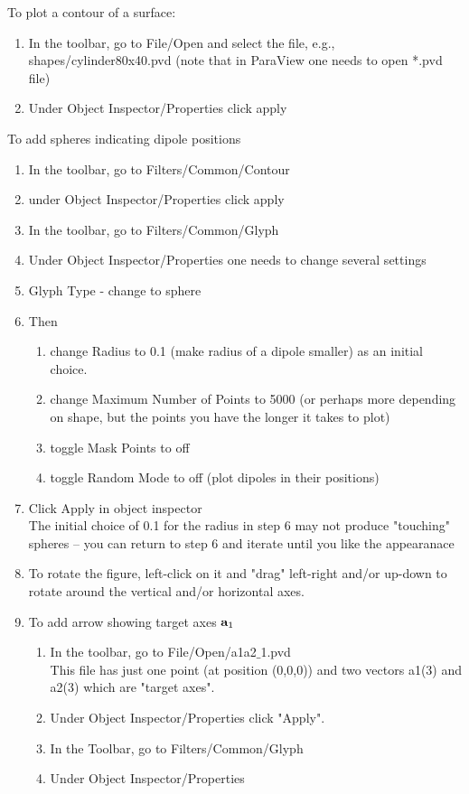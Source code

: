 To plot a contour of a surface:

\begin{enumerate}
\item In the toolbar, go to File/Open 
      and select the file, e.g., \textquotedbl{}shapes/cylinder80x40.pvd
      \textquotedbl{} (note that in ParaView one needs to open
{*}.pvd file) 
\item Under Object Inspector/Properties
 click \textquotedbl{}apply\textquotedbl{}
\end{enumerate}

To add spheres indicating dipole positions

\begin{enumerate}
\item In the toolbar, go to Filters/Common/Contour 
\item under Object Inspector/Properties click 
      \textquotedbl{}apply\textquotedbl{} 
\item In the toolbar, go to Filters/Common/Glyph
\item Under Object Inspector/Properties one needs to change
several settings 
\item Glyph Type - change to \textquotedbl{}sphere\textquotedbl{} 
\item Then

  \begin{enumerate}
  \item change \textquotedbl{}Radius\textquotedbl{} to 0.1 (make radius
  of a dipole smaller) as an initial choice.
  \item change \textquotedbl{}Maximum Number of Points\textquotedbl{} to 5000 
      (or perhaps more depending on shape, but
      the points you have the longer it takes to plot)
  \item toggle \textquotedbl{}Mask Points\textquotedbl{} to off 
  \item toggle \textquotedbl{}Random Mode\textquotedbl{} to off 
      (plot dipoles in their positions) 
  \end{enumerate} 

\item Click \textquotedbl{}Apply\textquotedbl{} in \textquotedbl{}object
inspector\textquotedbl{}\\
The initial choice of 0.1 for the radius in step 6 may
not produce "touching" spheres -- you can return to step 6
and
iterate until you like the appearanace
\item To rotate the figure, left-click on it and "drag" left-right
and/or up-down to rotate around the vertical and/or horizontal axes. 
\item To add arrow showing target axes ${\bf a}_1$
  \begin{enumerate}
  \item In the toolbar, go to File/Open/a1a2$\_$1.pvd \\
  This file has just one point (at position (0,0,0)) and
  two vectors a1(3) and a2(3) which are "target axes".
  \item Under Object Inspector/Properties click "Apply".
  \item In the Toolbar, go to Filters/Common/Glyph
  \item Under Object Inspector/Properties 


\end{enumerate}
\end{enumerate}
